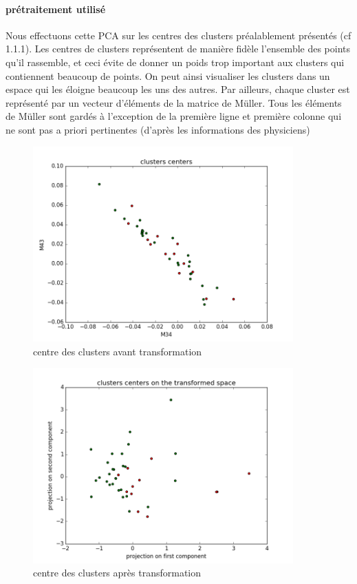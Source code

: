 \documentclass[a4paper,10pt]{report}
\begin{document}
\paragraph{prétraitement utilisé}
Nous effectuons cette PCA sur les centres des clusters préalablement présentés (cf 1.1.1). Les centres de clusters représentent de manière fidèle l'ensemble des points qu'il rassemble, et ceci évite de donner un poids trop important aux clusters qui contiennent beaucoup de points. On peut ainsi visualiser les clusters dans un espace qui les éloigne beaucoup les uns des autres. Par ailleurs, chaque cluster est représenté par un vecteur d'éléments de la matrice de Müller. Tous les éléments de Müller sont gardés à l’exception de la première ligne et première colonne qui ne sont pas a priori pertinentes (d'après les informations des physiciens)
\begin{figure}
  \caption{centre des clusters avant transformation}
  \centering
  \includegraphics[width=10cm]{PCA_0.png}
\end{figure}
\begin{figure}
  \caption{centre des clusters après transformation}
  \centering
  \includegraphics[width=10cm]{PCA_1.png}
\end{figure}
\end{document}
